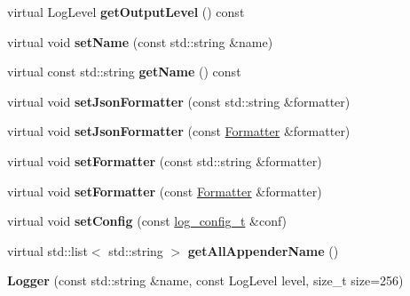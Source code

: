 \begin{DoxyCompactItemize}
virtual Log\+Level {\bfseries get\+Output\+Level} () const
\item 
\mbox{\label{classdaq_1_1Logger_a476bf0f707e09f1a596b0b866bde21fa}} 
virtual void {\bfseries set\+Name} (const std\+::string \&name)
\item 
\mbox{\label{classdaq_1_1Logger_af73ff307b7834b731cf6cc17148a36e5}} 
virtual const std\+::string {\bfseries get\+Name} () const
\item 
\mbox{\label{classdaq_1_1Logger_a1c3bc00ae27695474c7f054bdabc67c8}} 
virtual void {\bfseries set\+Json\+Formatter} (const std\+::string \&formatter)
\item 
\mbox{\label{classdaq_1_1Logger_a6ce72b03ca3604ca2600a0bfe25e5006}} 
virtual void {\bfseries set\+Json\+Formatter} (const \hyperlink{classdaq_1_1Formatter}{Formatter} \&formatter)
\item 
\mbox{\label{classdaq_1_1Logger_a0d75dceef7a9633572760853ae19afdc}} 
virtual void {\bfseries set\+Formatter} (const std\+::string \&formatter)
\item 
\mbox{\label{classdaq_1_1Logger_a23d83680637cd9d67ea9d2e039f38176}} 
virtual void {\bfseries set\+Formatter} (const \hyperlink{classdaq_1_1Formatter}{Formatter} \&formatter)
\item 
\mbox{\label{classdaq_1_1Logger_aaec0b6a70d3e3e64704f38464a86b789}} 
virtual void {\bfseries set\+Config} (const \hyperlink{structdaq_1_1LogConfigStruct}{log\+\_\+config\+\_\+t} \&conf)
\item 
\mbox{\label{classdaq_1_1Logger_ab68517334c0cf8be05b5aeee56d8f2f4}} 
virtual std\+::list$<$ std\+::string $>$ {\bfseries get\+All\+Appender\+Name} ()
\item 
\mbox{\label{classdaq_1_1Logger_abedfe3414b4a74fa84507a36c88a0a5b}} 
{\bfseries Logger} (const std\+::string \&name, const Log\+Level level, size\+\_\+t size=256)
\end{DoxyCompactItemize}
